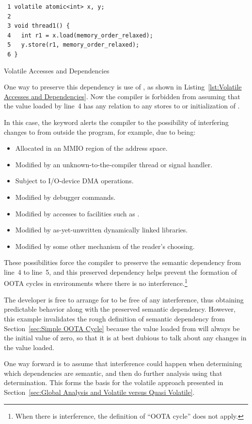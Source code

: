 \documentclass[10]{article}
\begin{document}
\begin{listing}
\begin{verbatim}
 1 volatile atomic<int> x, y;
 2
 3 void thread1() {
 4   int r1 = x.load(memory_order_relaxed);
 5   y.store(r1, memory_order_relaxed);
 6 }
\end{verbatim}
\caption{Volatile Accesses and Dependencies}
\label{lst:Volatile Accesses and Dependencies}
\end{listing}

One way to preserve this dependency is use of , as shown in
Listing~\ref{lst:Volatile Accesses and Dependencies}.
Now the compiler is forbidden from assuming that the value loaded
by line~4 has any relation to any stores to or initialization of .

In this case, the  keyword alerts the compiler to
the possibility of interfering changes to  from outside the
program, for example, due to  being:
\begin{itemize}
\item	Allocated in an MMIO region of the address space.
\item	Modified by an unknown-to-the-compiler thread
	or signal handler.
\item	Subject to I/O-device DMA operations.
\item	Modified by debugger commands.
\item	Modified by accesses to facilities such as .
\item	Modified by as-yet-unwritten dynamically linked libraries.
\item	Modified by some other mechanism of the reader's choosing.
\end{itemize}
These possibilities force the compiler to preserve the semantic
dependency from line~4 to line~5,
and this preserved dependency helps prevent the formation of OOTA cycles
in environments where there is no interference.\footnote{
	When there is interference, the definition of ``OOTA cycle''
	does not apply.}

The developer is free to arrange for  to be free of any
interference, thus obtaining predictable behavior along with the
preserved semantic dependency.
However, this example invalidates the rough definition of semantic
dependency from
Section~\ref{sec:Simple OOTA Cycle}
because the value loaded from  will always be the initial value
of zero, so that it is at best dubious to talk about any changes in
the value loaded.

One way forward is to assume that interference could happen when
determining which dependencies are semantic, and then do further analysis
using that determination.
This forms the basis for the volatile approach presented in
Section~\ref{sec:Global Analysis and Volatile versus Quasi Volatile}.
\end{document}
